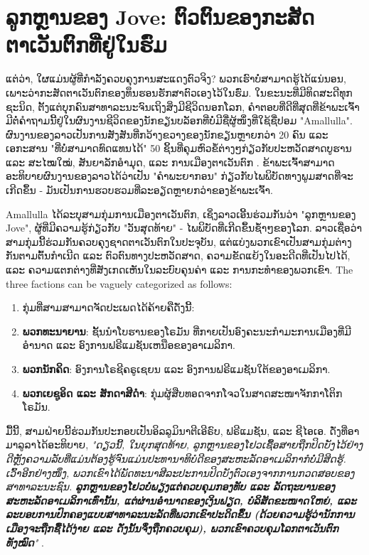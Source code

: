 \documentclass[10pt,twocolumn,letterpaper]{article}
\begin{document}
\section{ລູກຫຼານຂອງ Jove: ຕົວຕົນຂອງກະສັດຕາເວັນຕົກທີ່ຢູ່ໃນຮົ່ມ}

ແຕ່ວ່າ, ໃຜແມ່ນຜູ້ທີ່ກຳລັງຄວບຄຸງການສະແດງຕົວຈິງ? ພວກເຮົາບໍ່ສາມາດຮູ້ໄດ້ແນ່ນອນ, ເພາະວ່າກະສັດຕາເວັນຕົກຂອງທຶນຮອນຮັກສາຕົວເອງໄວ້ໃນຮົ່ມ. ໃນຂະນະທີ່ມີທິດສະດີທຸກຊະນິດ, ຕັ້ງແຕ່ບຸກຄົນສາທາລະນະຈົນເຖິງສິ່ງມີຊີວິດນອກໂລກ, ຄຳຕອບທີ່ດີທີ່ສຸດທີ່ຂ້າພະເຈົ້າມີຕໍ່ຄຳຖາມນີ້ຢູ່ໃນຜົນງານຊີວິດຂອງນັກຂຽນບລັອກທີ່ບໍ່ມີຊື່ຜູ້ໜຶ່ງທີ່ໃຊ້ຊື່ປອມ "Amallulla". ຜົນງານຂອງລາວເປັນການສັງສັນທີ່ກວ້າງຂວາງຂອງນັກຂຽນຫຼາຍກວ່າ 20 ຄົນ ແລະ ເອກະສານ "ທີ່ບໍ່ສາມາດທົດແທນໄດ້" 50 ຊິ້ນທີ່ຄຸມຫົວຂໍ້ຕ່າງໆກ່ຽວກັບປະຫວັດສາດບູຮານ ແລະ ສະໄໝໃໝ່, ສັນຍາລັກອຳມຸດ, ແລະ ການເມືອງຕາເວັນຕົກ \cite{33,34}. ຂ້າພະເຈົ້າສາມາດອະທິບາຍຜົນງານຂອງລາວໄດ້ວ່າເປັນ "ຄຳພະຍາກອນ" ກ່ຽວກັບໄພພິບັດທາງພູມສາດທີ່ຈະເກີດຂຶ້ນ - ມັນເປັນການຮວບຮວມທີ່ລະອຽດຫຼາຍກວ່າຂອງຂ້າພະເຈົ້າ.

Amallulla ໄດ້ລະບຸສາມກຸ່ມການເມືອງຕາເວັນຕົກ, ເຊິ່ງລາວເອີ້ນຮ່ວມກັນວ່າ "ລູກຫຼານຂອງ Jove", ຜູ້ທີ່ມີຄວາມຮູ້ກ່ຽວກັບ "ວັນສຸດທ້າຍ" - ໄພພິບັດທີ່ເກີດຂຶ້ນຊ້ຳໆຂອງໂລກ. ລາວເຊື່ອວ່າສາມກຸ່ມນີ້ຮ່ວມກັນຄວບຄຸງຊາດຕາເວັນຕົກໃນປະຈຸບັນ, ແຕ່ແບ່ງພວກເຂົາເປັນສາມກຸ່ມຕ່າງກັນຕາມຕົ້ນກຳເນີດ ແລະ ຕົວຕົນທາງປະຫວັດສາດ, ຄວາມຂັດແຍ້ງໃນອະດີດທີ່ເປັນໄປໄດ້, ແລະ ຄວາມແຕກຕ່າງທີ່ສັງເກດເຫັນໃນລະບົບຄຸນຄ່າ ແລະ ການກະທຳຂອງພວກເຂົາ.
The three factions can be vaguely categorized as follows:

\begin{flushleft}
\begin{enumerate}
\item ກຸ່ມທີ່ສາມສາມາດຈັດປະເພດໄດ້ຄ້າຍຄືດັ່ງນີ້:
    \item \textbf{ພວກທະນາຍານ}: ຊັ້ນນຳໂບຮານຂອງໂຣມັນ ທີ່ກາຍເປັນອົງຄະນະກຳມະການເມືອງທີ່ມີອຳນາດ ແລະ ອົງການຟຣີແມຊັນເຫນືອຂອງອາເມລິກາ.
    \item \textbf{ພວກນັກຄິດ}: ອົງການໂຣຊີຄຣູເຊຍນ ແລະ ອົງການຟຣີແມຊັນໃຕ້ຂອງອາເມລິກາ.
    \item \textbf{ພວກເຍຊູອິດ ແລະ ສັກດາສີດຳ}: ກຸ່ມຜູ້ສືບທອດຈາກໂຈວໃນສາດສະໜາຈັກກາໂຕິກໂຣມັນ.
\end{enumerate}
\end{flushleft}
ມື້ນີ້, ສາມຝ່າຍນີ້ຮ່ວມກັນປະກອບເປັນອິລລູມິນາຕີເອີຣົບ, ຟຣີແມຊັນ, ແລະ ຊີໄອເອ. ດັ່ງທີ່ອາມາລູລາໄດ້ອະທິບາຍ, \textit{"ດຽວນີ້, ໃນຍຸກສຸດທ້າຍ, ລູກຫຼານຂອງໂຢວເຊື້ອສາຍຖືກປິດບັງໄວ້ຢ່າງດີຫຼັງຄວາມລັບທີ່ແມ່ນຕ້ອງຮູ້ຈົນແມ່ນປະທານາທິບໍດີຂອງສະຫະລັດອາເມລິກາກໍບໍ່ມີສິດຮູ້. ເວົ້າອີກຢ່າງໜຶ່ງ, ພວກເຂົາໄດ້ພັດທະນາສີລະປະການປິດບັງຕົວເອງຈາກການກວດສອບຂອງສາທາລະນະຊົນ. \textbf{ລູກຫຼານຂອງໂຢວບໍ່ພຽງແຕ່ຄວບຄຸມກອງທັບ ແລະ ລັດຖະບານຂອງສະຫະລັດອາເມລິກາເທົ່ານັ້ນ, ແຕ່ຜ່ານອຳນາດຂອງເງິນຟຽດ, ບໍລິສັດຂະໜາດໃຫຍ່, ແລະ ລະບອບການປົກຄອງແບບສາທາລະນະລັດທີ່ພວກເຂົາປະດິດຂຶ້ນ (ດ້ວຍຄວາມຮູ້ວ່ານັກການເມືອງຈະຖືກຊື້ໄດ້ງ່າຍ ແລະ ດັ່ງນັ້ນຈຶ່ງຖືກຄວບຄຸມ), ພວກເຂົາຄວບຄຸມໂລກຕາເວັນຕົກທັງໝົດ}"} \cite{33,34}.
\end{document}
